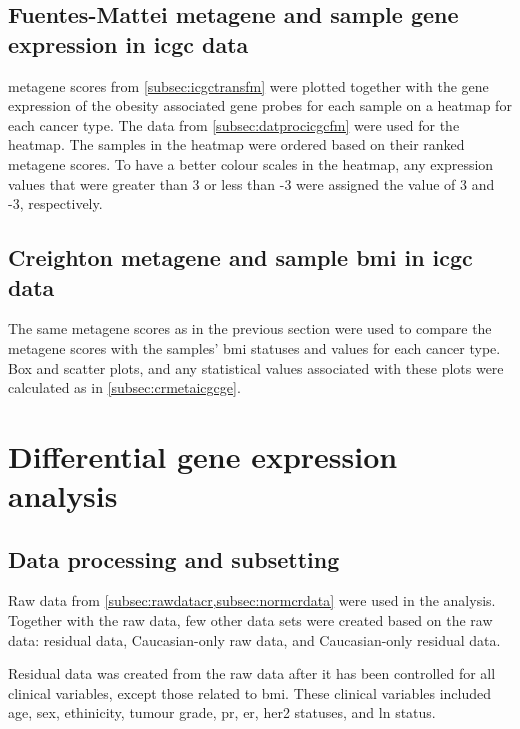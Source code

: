 \subsection{Fuentes-Mattei metagene and sample gene expression in \gls{icgc} data}
\label{subsec:fmmetaicgcge}

\Gls{metagene} scores from \cref{subsec:icgctransfm} were plotted together with the gene expression of the obesity associated gene probes for each sample on a heatmap for each cancer type.
The data from \cref{subsec:datprocicgcfm} were used for the heatmap.
The samples in the heatmap were ordered based on their ranked \gls{metagene} scores.
To have a better colour scales in the heatmap, any expression values that were greater than 3 or less than -3 were assigned the value of 3 and -3, respectively.

\subsection{Creighton metagene and sample \gls{bmi} in \gls{icgc} data}
\label{subsec:fmmetaicgcge}

The same \gls{metagene} scores as in the previous section were used to compare the \gls{metagene} scores with the samples' \gls{bmi} statuses and values for each cancer type.
Box and scatter plots, and any statistical values associated with these plots were calculated as in \cref{subsec:crmetaicgcge}.

\section{Differential gene expression analysis}
\label{sec:deg}

\subsection{Data processing and subsetting}
\label{subsec:subdatadeg}

Raw data from \cref{subsec:rawdatacr,subsec:normcrdata} were used in the analysis.
Together with the raw data, few other data sets were created based on the raw data: residual data, Caucasian-only raw data, and Caucasian-only residual data.

Residual data was created from the raw data after it has been controlled for all clinical variables, except those related to \gls{bmi}.
These clinical variables included age, sex, ethinicity, tumour grade, \gls{pr}, \gls{er}, \gls{her2} statuses, and \gls{ln} status.

